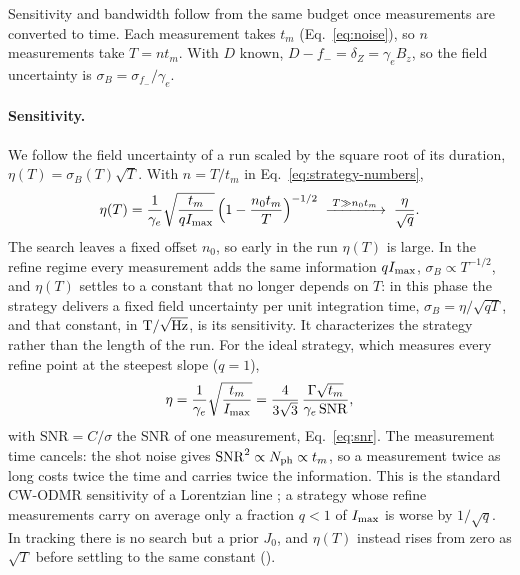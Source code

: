 Sensitivity and bandwidth follow from the same budget once measurements are converted to time. Each
measurement takes $t_m$ (Eq.~\eqref{eq:noise}), so $n$ measurements take $T=n t_m$. With $D$
known, $D-f_-=\delta_Z=\gamma_e B_z$, so the field uncertainty is $\sigma_B=\sigma_{f_-}/\gamma_e$.

\paragraph{Sensitivity.} We follow the field uncertainty of a run scaled by the square root of its duration,
$\eta(T)=\sigma_B(T)\sqrt T$. With $n=T/t_m$ in Eq.~\eqref{eq:strategy-numbers},
\begin{equation}
  \eta(T)=\frac{1}{\gamma_e}\sqrt{\frac{t_m}{qI_{\rm max}}}\,\Big(1-\frac{n_0t_m}{T}\Big)^{-1/2}
  \;\xrightarrow{\;T\gg n_0t_m\;}\;\frac{\eta}{\sqrt q}.
  \label{eq:eta-run}
\end{equation}
The search leaves a fixed offset $n_0$, so early in the run $\eta(T)$ is large. In the refine regime every
measurement adds the same information $qI_{\rm max}$, $\sigma_B\propto T^{-1/2}$, and $\eta(T)$ settles to a constant
that no longer depends on $T$: in this phase the strategy delivers a fixed field uncertainty per unit integration
time, $\sigma_B=\eta/\sqrt{qT}$, and that constant, in ${\rm T}/\sqrt{\rm Hz}$, is its sensitivity. It characterizes
the strategy rather than the length of the run. For the ideal strategy, which measures every refine point at the
steepest slope ($q=1$),
\begin{equation}
  \eta=\frac{1}{\gamma_e}\sqrt{\frac{t_m}{I_{\rm max}}}
  =\frac{4}{3\sqrt3}\,\frac{\Gamma\sqrt{t_m}}{\gamma_e\,\mathrm{SNR}},
  \label{eq:sensitivity}
\end{equation}
with $\mathrm{SNR}=C/\sigma$ the SNR of one measurement, Eq.~\eqref{eq:snr}. The measurement time cancels: the
shot noise gives $\mathrm{SNR}^2\propto N_{\rm ph}\propto t_m$, so a measurement twice as long costs twice the time
and carries twice the information. This is the
standard CW-ODMR sensitivity of a Lorentzian line \cite{dreau2011}; a strategy whose refine measurements carry on
average only a fraction $q<1$ of $I_{\rm max}$ is worse by $1/\sqrt q$. In tracking there is no search but a prior
$J_0$, and $\eta(T)$ instead rises from zero as $\sqrt T$ before settling to the same constant
().


